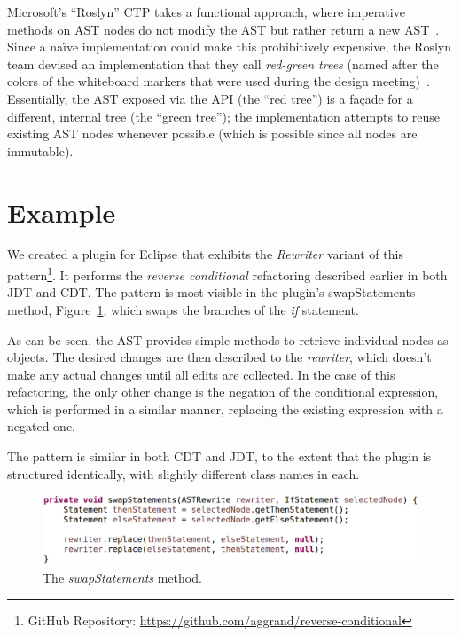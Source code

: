 \documentclass[prodmode]{acmlarge}
\begin{document}
Microsoft's ``Roslyn'' CTP takes a functional approach, where imperative
methods on AST nodes do not modify the AST but rather return a new
AST~\cite{vogel12roslyn}.  Since a na\"{i}ve implementation could make this
prohibitively expensive, the Roslyn team devised an implementation that
they call \textit{red-green trees} (named after the colors of the
whiteboard markers that were used during the design
meeting)~\cite{lippert12persistence}.  Essentially, the AST exposed via the API
(the ``red tree'') is a fa\c{c}ade for a different, internal tree (the ``green
tree''); the implementation attempts to reuse existing AST nodes whenever
possible (which is possible since all nodes are immutable).


\section{Example}
We created a plugin for Eclipse that exhibits the \emph{Rewriter} variant of this
pattern\footnote{GitHub Repository: \url{https://github.com/aggrand/reverse-conditional}}. It performs the \emph{reverse conditional} refactoring described 
earlier in both JDT and CDT. The pattern is most visible in the plugin's
swapStatements method, Figure~\ref{fig:swapStatements}, which swaps the 
branches of the \emph{if} statement.

As can be seen, the AST provides simple methods to retrieve individual nodes as
objects. The desired changes are then described to the \emph{rewriter}, which
doesn't make any actual changes until all edits are collected. In the case of
this refactoring, the only other change is the negation of the conditional 
expression, which is performed in a similar manner, replacing the existing
expression with a negated one. 

The pattern is similar in both CDT and JDT, to the extent that the plugin is
structured identically, with slightly different class names in each.

\begin{figure}
\begin{center}
\includegraphics[scale=0.30]{swapStatements.eps}
\caption{The \emph{swapStatements} method.\vspace*{-4em}}
\label{fig:swapStatements}
\end{center}
\end{figure}
\end{document}
